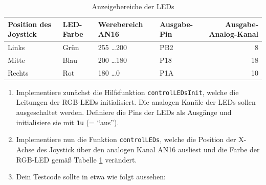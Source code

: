 \begin{table}[!htb]
    \centering
    \caption{Anzeigebereiche der LEDs}
    \label{tab:controlLED}
    \begin{tabular}{llllr}
        \toprule
        \textbf{Position des Joystick} & \textbf{LED-Farbe} & \textbf{Werebereich AN16} & \textbf{Ausgabe-Pin} & \textbf{Ausgabe-Analog-Kanal}\\
        \midrule
        Links & Grün & 255 \dots 200 & PB2 & 8\\
        Mitte & Blau & 200 \dots 180 & P18 & 18\\
        Rechts & Rot & 180 \dots 0 & P1A & 10\\
        \bottomrule
    \end{tabular}
\end{table}

\begin{enumerate}
\item
Implementiere zunächst die Hilfsfunktion \lstinline|controlLEDsInit|, welche die Leitungen der RGB-LEDs initialisiert. Die analogen Kanäle der LEDs sollen ausgeschaltet werden.
Definiere die Pins der LEDs als Ausgänge und initialisiere sie mit \lstinline|1u| (= \enquote{aus}). 

\item
Implementiere nun die Funktion \lstinline|controlLEDs|, welche die Position der X-Achse des Joystick über den analogen Kanal AN16 ausliest und die Farbe der RGB-LED gemäß Tabelle \ref{tab:controlLED} verändert. 

\item 
Dein Testcode sollte in etwa wie folgt aussehen:

\end{enumerate}

